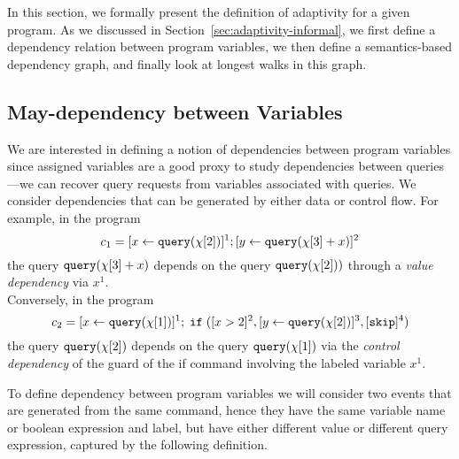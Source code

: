 In this section, we formally present the definition of adaptivity for a given program.
As we discussed in Section~\ref{sec:adaptivity-informal}, we first define a dependency relation between program variables,
we then define a semantics-based dependency graph, and finally look at longest walks in this graph. 
\subsection{May-dependency between Variables}
\label{sec:dep}
We are interested in defining a notion of dependencies between program variables since assigned variables are a good proxy to study dependencies between queries---we can recover query requests from variables associated with queries. We consider dependencies that can be generated by either data or control flow.
For example, in the program 
\[c_1 =[\mathrel{ x \leftarrow {\tt query}(\chi[2]) }]^1 ;[\mathrel{ y \leftarrow {\tt query}(\chi[3] + x) }]^2\]
the query ${\tt query}(\chi[3] + x)$  depends on the query ${\tt query}(\chi[2]))$ through a \emph{value dependency} via  $x^1$.
\\
Conversely, in the program
\[c_2 = [\mathrel{ x \leftarrow {\tt query}(\chi[1]) }]^1 ; \;\mathtt{if}\;( [x > 2]^2 , [\mathrel{ y \leftarrow {\tt query}(\chi[2]) }]^3, [\mathtt{skip}]^4 )\] 
the query ${\tt query}(\chi[2])$ 
depends on the query ${\tt query}(\chi[1])$ via the \emph{control dependency} of the guard of the if command involving the labeled variable $x^1$.

To define dependency between program variables we will consider two events that are generated from the same command, hence they have the same variable name or boolean expression and label, but have either different value or different query expression, captured by the following definition. 

